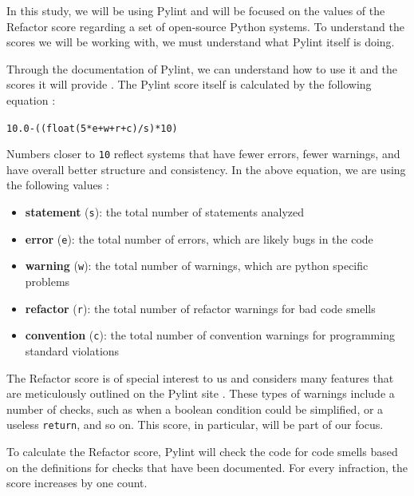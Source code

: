\documentclass[12pt,conference]{IEEEtran}
\newcommand{\code}[1]{\texttt{#1}}
\begin{document}
In this study, we will be using Pylint and will be focused on the values of the Refactor score regarding a set of open-source Python systems. To understand the scores we will be working with, we must understand what Pylint itself is doing. 

Through the documentation of Pylint, we can understand how to use it and the scores it will provide \cite{pylint:main}. The Pylint score itself is calculated by the following equation \cite{pylint:score}:

\vspace{0.25cm}
\code{10.0-((float(5*e+w+r+c)/s)*10)}
\vspace{0.25cm}

Numbers closer to \code{10} reflect systems that have fewer errors, fewer warnings, and have overall better structure and consistency. In the above equation, we are using the following values \cite{pylint:docs}:

\vspace{0.25cm}
\begin{itemize}
    \item \textbf{statement} (\code{s}): the total number of statements analyzed
    \item \textbf{error} (\code{e}): the total number of errors, which are likely bugs in the code
    \item \textbf{warning} (\code{w}): the total number of warnings, which are python specific problems
    \item \textbf{refactor} (\code{r}): the total number of refactor warnings for bad code smells
    \item \textbf{convention} (\code{c}): the total number of convention warnings for programming standard violations
\end{itemize}
\vspace{0.25cm}

The Refactor score is of special interest to us and considers many features that are meticulously outlined on the Pylint site \cite{pylint:refactor}. These types of warnings include a number of checks, such as when a boolean condition could be simplified, or a useless \code{return}, and so on. This score, in particular, will be part of our focus.

To calculate the Refactor score, Pylint will check the code for code smells based on the definitions for checks that have been documented. For every infraction, the score increases by one count. 

\end{document}
